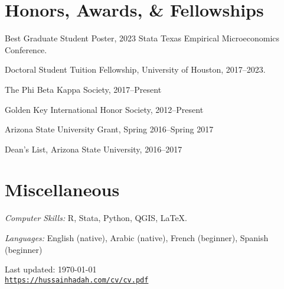 \documentclass[10pt,letterpaper]{article}
\def\footerlink{https://hussainhadah.com/cv/cv.pdf}
\renewenvironment{itemize}{
  \begin{list}{}{
    \setlength{\leftmargin}{1.5em}
  }
}{
  \end{list}
}
\begin{document}
\section*{Honors, Awards, \& Fellowships}
%
\begin{itemize}
\item Best Graduate Student Poster, 2023 Stata Texas Empirical Microeconomics Conference.
\item Doctoral Student Tuition Fellowship, University of Houston, 2017--2023.
\item The Phi Beta Kappa Society, 2017--Present
\item Golden Key International Honor Society, 2012--Present
\item Arizona State University Grant, Spring 2016--Spring 2017
\item Dean's List, Arizona State University, 2016--2017
\end{itemize}


\section*{Miscellaneous}
%
\begin{itemize}
\item \textit{Computer Skills:} R, Stata, Python, QGIS, \LaTeX.
\item \textit{Languages:} English (native), Arabic (native), French (beginner), Spanish (beginner)
\end{itemize}
%
%

\bigskip

\begin{center}
  \begin{footnotesize}
    Last updated: \today \\
    \href{\footerlink}{\texttt{\footerlink}}
  \end{footnotesize}
\end{center}
\end{document}

